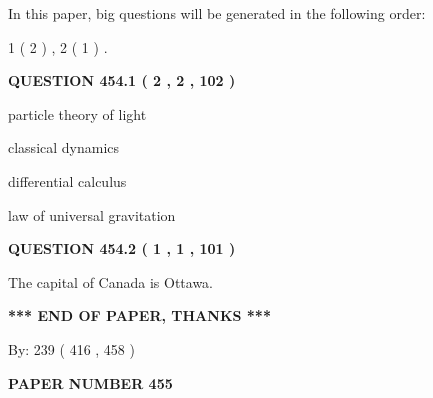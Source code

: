 \documentclass[12pt]{article}
\begin{document}
In this paper, big questions will be generated in the following order: 
   
   
   1 ( 2 )
 ,
   2 ( 1 )
 .
  
\vspace{0.2in}
  
{\textbf{\Large{QUESTION
454.1 
 ( 2 , 2 , 102 )
}}}
  
  
 
 
\noindent{}
 
 
particle theory of light
 
 
classical dynamics
 
 
differential calculus
 
 
law of universal gravitation
 
 
 
 
  
\vspace{0.2in}
  
{\textbf{\Large{QUESTION
454.2 
 ( 1 , 1 , 101 )
}}}
  
  
 
 
\noindent{}
 
 
The capital of Canada is Ottawa.
 
 
 
 
   
   
\vspace{1.0in} 
{\textbf{\large{ *** END OF PAPER, THANKS *** }}} 
   
   
\hspace{1.0in} By: 
 239 ( 416 ,  458 )
   
   
   
   
\newpage 
\setcounter{page}{ 
   455001 } 
   
   
   
   
 {\textbf{ \Large{ PAPER NUMBER  455  }}}
   
   
\vspace{0.2in}
   
   
   
   
   
\vspace{0.2in}
   
\end{document}
